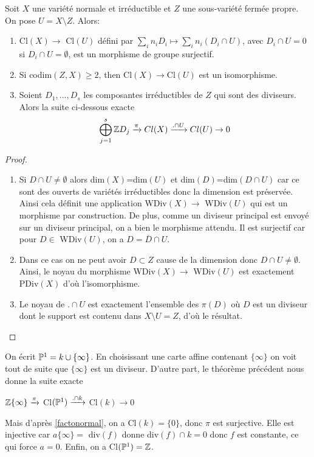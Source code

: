 \begin{thm}
Soit $X$ une variété normale et irréductible et $Z$ une sous-variété fermée propre. On pose $U=X\setminus Z$. Alors:
\begin{enumerate}
\item Cl$(X)\rightarrow$ Cl$(U)$ défini par $\sum_i n_iD_i\mapsto \sum_i n_i(D_i\cap U)$, avec $D_i\cap U = 0$ si $D_i\cap U=\emptyset $, est un morphisme de groupe surjectif.
\item Si codim$(Z,X)\geq 2$, then Cl$(X)\rightarrow$Cl$(U)$ est un isomorphisme.
\item Soient $D_1,..., D_s$ les composantes irréductibles de $Z$ qui sont des diviseurs. Alors la suite ci-dessous exacte $$\bigoplus_{j=1}^s \mathbb{Z} D_j \xrightarrow{\pi} Cl(X) \xrightarrow{.\cap U} Cl(U) \rightarrow 0 $$
\end{enumerate}
\end{thm}
\begin{proof}
\begin{enumerate}
\item Si $D\cap U\neq \emptyset$ alors dim$(X)$=dim$(U)$ et dim$(D)$=dim$(D\cap U)$ car ce sont des ouverts de variétés irréductibles donc la dimension est préservée. Ainsi cela définit une application WDiv$(X)\rightarrow$ WDiv$(U)$ qui est un morphisme par construction. De plus, comme un diviseur principal est envoyé sur un diviseur principal, on a bien le morphisme attendu. Il est surjectif car pour $D\in$ WDiv$(U)$, on a $D=\overline{D}\cap U$.
\item Dans ce cas on ne peut avoir $D\subset Z$ cause de la dimension donc $D\cap U\neq \emptyset$. Ainsi, le noyau du morphisme WDiv$(X)\rightarrow$ WDiv$(U)$ est exactement PDiv$(X)$ d'où l'isomorphisme.
\item Le noyau de $.\cap U$ est exactement l'ensemble des $\pi(D)$ où $D$ est un diviseur dont le support est contenu dans $X\setminus U=Z$, d'où le résultat.
\end{enumerate}
\end{proof}

\begin{ex}
On écrit $\mathbb{P} ^1=k\cup \lbrace\infty\rbrace$. En choisissant une carte affine contenant $\lbrace\infty\rbrace$ on voit tout de suite que  $\lbrace\infty\rbrace$ est un diviseur. D'autre part, le théorème précédent nous donne la suite exacte 
\begin{center}
 $\mathbb{Z} \lbrace\infty\rbrace \xrightarrow{\pi}$ Cl$(\mathbb{P} ^1) \xrightarrow{.\cap k} $ Cl$(k) \rightarrow 0 $
\end{center}
Mais d'après \ref{factonormal}, on a Cl$(k)=\lbrace 0 \rbrace$, donc $\pi$ est surjective. Elle est injective car $a\lbrace\infty\rbrace=$ div$(f)$ donne    
div$(f)\cap k = 0$ donc $f$ est constante, ce qui force $a=0$. Enfin, on a Cl$(\mathbb{P} ^1)=\mathbb{Z}$.
\end{ex}

